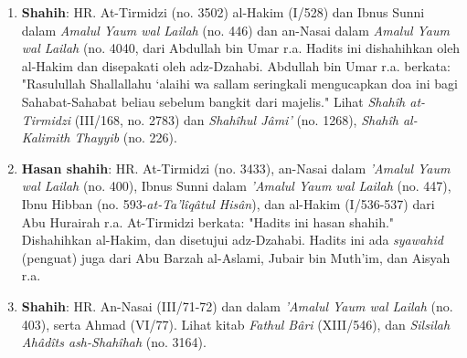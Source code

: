 \documentclass[a4paper,12pt]{article}
\begin{document}
\begin{enumerate}
\item \textbf{Shahih}: HR. At-Tirmidzi (no. 3502) al-Hakim (I/528) dan 
Ibnus Sunni dalam \textit{Amalul Yaum wal Lailah} (no. 446) dan an-Nasai 
dalam \textit{Amalul Yaum wal Lailah} (no. 4040, dari Abdullah bin Umar 
r.a. Hadits ini dishahihkan oleh al-Hakim dan disepakati oleh adz-Dzahabi. 
Abdullah bin Umar r.a. berkata: "Rasulullah Shallallahu ‘alaihi wa sallam 
seringkali mengucapkan doa ini bagi Sahabat-Sahabat beliau sebelum bangkit 
dari majelis." Lihat \textit{Shah\^{i}h at-Tirmidzi} (III/168, no. 2783) 
dan \textit{Shah\^{i}hul J\^{a}mi'} (no. 1268), \textit{Shah\^{i}h 
al-Kalimith Thayyib} (no. 226).
\item \textbf{Hasan shahih}: HR. At-Tirmidzi (no. 3433), an-Nasai dalam 
\textit{'Amalul Yaum wal Lailah} (no. 400), Ibnus Sunni dalam 
\textit{'Amalul Yaum wal Lailah} (no. 447), Ibnu Hibban (no. 
593-\textit{at-Ta'l\^{i}q\^{a}tul His\^{a}n}), dan al-Hakim (I/536-537) 
dari Abu Hurairah r.a. At-Tirmidzi berkata: "Hadits ini hasan shahih." 
Dishahihkan al-Hakim, dan disetujui adz-Dzahabi. Hadits ini ada 
\textit{syawahid} (penguat) juga dari Abu Barzah al-Aslami, Jubair bin 
Muth'im, dan Aisyah r.a.
\item \textbf{Shahih}: HR. An-Nasai (III/71-72) dan dalam \textit{'Amalul 
Yaum wal Lailah} (no. 403), serta Ahmad (VI/77). Lihat kitab \textit{Fathul
B\^{a}ri} (XIII/546), dan \textit{Silsilah Ah\^{a}d\^{i}ts 
ash-Shah\^{i}hah} (no. 3164).
\end{enumerate}
\end{document}
